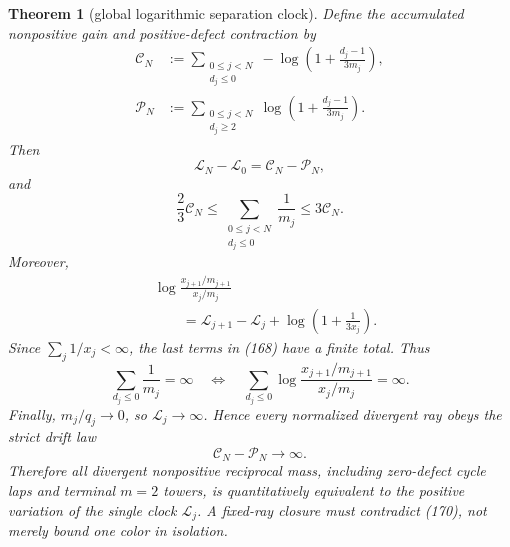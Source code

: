 \documentclass[11pt]{article}
\newtheorem{theorem}{Theorem}
\begin{document}
\begin{theorem}[global logarithmic separation clock]
Define the accumulated nonpositive gain and positive-defect contraction by
\[
\begin{aligned}
  \mathcal C_N
  &:=\sum_{\substack{0\leq j<N\\d_j\leq0}}
    -\log\left(1+\frac{d_j-1}{3m_j}\right),\\
  \mathcal P_N
  &:=\sum_{\substack{0\leq j<N\\d_j\geq2}}
    \log\left(1+\frac{d_j-1}{3m_j}\right).
\end{aligned}
\tag{165}
\]
Then
\[
\boxed{
  \mathcal L_N-\mathcal L_0
  =\mathcal C_N-\mathcal P_N,}
\tag{166}
\]
and
\[
  \frac23\mathcal C_N
  \leq\sum_{\substack{0\leq j<N\\d_j\leq0}}\frac1{m_j}
  \leq3\mathcal C_N.
\tag{167}
\]
Moreover,
\[
\boxed{
\begin{aligned}
  &\log\frac{x_{j+1}/m_{j+1}}{x_j/m_j}\\
  &\qquad=\mathcal L_{j+1}-\mathcal L_j
  +\log\left(1+\frac1{3x_j}\right).
\end{aligned}}
\tag{168}
\]
Since $\sum_j1/x_j<\infty$, the last terms in (168) have a finite total.
Thus
\[
\boxed{
  \sum_{d_j\leq0}\frac1{m_j}=\infty
  \quad\Longleftrightarrow\quad
  \sum_{d_j\leq0}
  \log\frac{x_{j+1}/m_{j+1}}{x_j/m_j}=\infty.}
\tag{169}
\]
Finally, $m_j/q_j\to0$, so $\mathcal L_j\to\infty$.  Hence every
normalized divergent ray obeys the strict drift law
\[
\boxed{\mathcal C_N-\mathcal P_N\longrightarrow\infty.}
\tag{170}
\]
Therefore all divergent nonpositive reciprocal mass, including zero-defect
cycle laps and terminal $m=2$ towers, is quantitatively equivalent to the
positive variation of the single clock $\mathcal L_j$.  A fixed-ray closure
must contradict (170), not merely bound one color in isolation.
\end{theorem}
\end{document}
